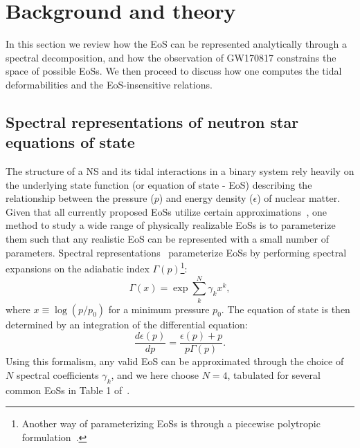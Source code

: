\documentclass[prd,twocolumn,nofootinbib,superscriptaddress,amsmath,amssymb]{revtex4-1}
\begin{document}
\section{Background and theory}\label{sec:theory}

In this section we review how the EoS can be represented analytically
through a spectral decomposition, and how the observation of GW170817
constrains the space of possible EoSs. We then proceed to discuss 
how one computes the tidal deformabilities and the EoS-insensitive relations. 

\subsection{Spectral representations of neutron star equations of state}
\label{sec:eos}

The structure of a NS and its tidal interactions in a binary system rely heavily on the underlying state function (or equation of state - EoS) describing the relationship between the pressure ($p$) and energy density ($\epsilon$) of nuclear matter.
Given that all currently proposed EoSs utilize certain approximations~\cite{Oertel:Review,Baym:Review}, one method to study a wide range of physically realizable EoSs is to parameterize them such that any realistic EoS can be represented with a small number of parameters.
Spectral representations~\cite{Lindblom:2010bb,Lindblom:2012zi,Lindblom:2013kra,Lindblom:2018rfr,Abbott:2018exr} parameterize EoSs by performing spectral expansions on the adiabatic index $\Gamma(p)$\footnote{Another way of parameterizing EoSs is through a piecewise polytropic formulation~\cite{Read2009,Lackey:2014fwa,Carney:2018sdv}.}:
\begin{equation}
\Gamma(x) = \exp{\sum_k^{N}\gamma_k x^k},
\end{equation}
where $x \equiv \log{(p/p_0)}$ for a minimum pressure $p_0$.
The equation of state is then determined by an integration of the differential equation:
\begin{equation}
\frac{d \epsilon(p)}{dp}=\frac{\epsilon(p)+p}{p \Gamma(p)}.
\end{equation}
Using this formalism, any valid EoS can be approximated through the choice of $N$ spectral coefficients $\gamma_k$, and we here choose $N=4$, tabulated for several common EoSs in Table 1 of~\cite{Lindblom:2018rfr}.

{}
\end{document}

